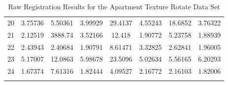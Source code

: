 \begin{center}
\begin{longtable}{cccccccc}
20 & 3.75736 & 5.50361 & 3.99929 & 29.4137 & 4.55243 & 18.6852 & 3.76322\\
21 & 2.12519 & 3888.74 & 3.52166 & 12.418 & 1.90772 & 5.23758 & 1.88939\\
22 & 2.43943 & 2.40684 & 1.90791 & 8.61471 & 3.32825 & 2.62841 & 1.96005\\
23 & 5.17007 & 12.0863 & 5.98678 & 23.5096 & 5.02634 & 5.56165 & 6.20293\\
24 & 1.67374 & 7.61316 & 1.82444 & 4.09527 & 2.16772 & 2.16103 & 1.82006\\
\caption{Raw Registration Results for the Apartment Texture Rotate Data Set}
\label{tab:apartmenttexturerotateFULL}
\end{longtable}
\end{center} 


